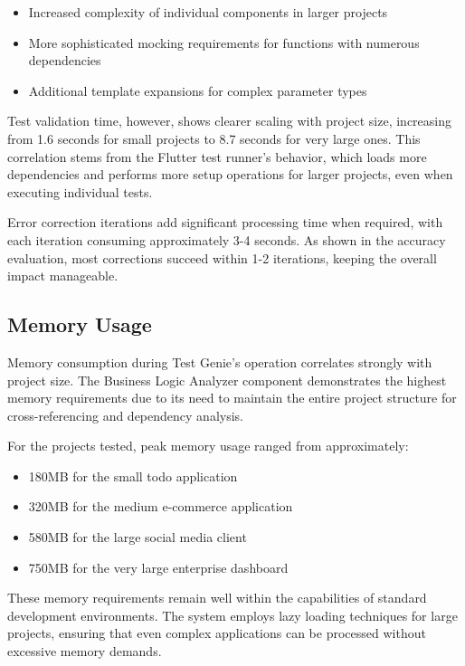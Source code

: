 \begin{itemize}
    \item Increased complexity of individual components in larger projects
    \item More sophisticated mocking requirements for functions with numerous dependencies
    \item Additional template expansions for complex parameter types
\end{itemize}

Test validation time, however, shows clearer scaling with project size, increasing from 1.6 seconds for small projects to 8.7 seconds for very large ones. This correlation stems from the Flutter test runner's behavior, which loads more dependencies and performs more setup operations for larger projects, even when executing individual tests.

Error correction iterations add significant processing time when required, with each iteration consuming approximately 3-4 seconds. As shown in the accuracy evaluation, most corrections succeed within 1-2 iterations, keeping the overall impact manageable.

\subsection{Memory Usage}

Memory consumption during Test Genie's operation correlates strongly with project size. The Business Logic Analyzer component demonstrates the highest memory requirements due to its need to maintain the entire project structure for cross-referencing and dependency analysis.

For the projects tested, peak memory usage ranged from approximately:
\begin{itemize}
    \item 180MB for the small todo application
    \item 320MB for the medium e-commerce application
    \item 580MB for the large social media client
    \item 750MB for the very large enterprise dashboard
\end{itemize}

These memory requirements remain well within the capabilities of standard development environments. The system employs lazy loading techniques for large projects, ensuring that even complex applications can be processed without excessive memory demands.

